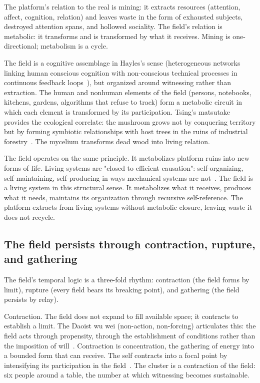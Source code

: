 The platform's relation to the real is mining: it extracts resources (attention, affect, cognition, relation) and leaves waste in the form of exhausted subjects, destroyed attention spans, and hollowed sociality. The field's relation is metabolic: it transforms and is transformed by what it receives. Mining is one-directional; metabolism is a cycle.

The field is a cognitive assemblage in Hayles's sense (heterogeneous networks linking human conscious cognition with non-conscious technical processes in continuous feedback loops~\cite{hayles2017}), but organized around witnessing rather than extraction. The human and nonhuman elements of the field (persons, notebooks, kitchens, gardens, algorithms that refuse to track) form a metabolic circuit in which each element is transformed by its participation. Tsing's matsutake provides the ecological correlate: the mushroom grows not by conquering territory but by forming symbiotic relationships with host trees in the ruins of industrial forestry~\cite{tsing2015}. The mycelium transforms dead wood into living relation.

The field operates on the same principle. It metabolizes platform ruins into new forms of life. Living systems are "closed to efficient causation": self-organizing, self-maintaining, self-producing in ways mechanical systems are not~\cite{rosen1991}. The field is a living system in this structural sense. It metabolizes what it receives, produces what it needs, maintains its organization through recursive self-reference. The platform extracts from living systems without metabolic closure, leaving waste it does not recycle.

\subsection{The field persists through contraction, rupture, and gathering}

The field's temporal logic is a three-fold rhythm: contraction (the field forms by limit), rupture (every field bears its breaking point), and gathering (the field persists by relay).

Contraction. The field does not expand to fill available space; it contracts to establish a limit. The Daoist wu wei (non-action, non-forcing) articulates this: the field acts through propensity, through the establishment of conditions rather than the imposition of will~\cite[ch.~48]{laozi_daodejing}\cite{jullien1992}. Contraction is concentration, the gathering of energy into a bounded form that can receive. The self contracts into a focal point by intensifying its participation in the field~\cite{ames2011}. The cluster is a contraction of the field: six people around a table, the number at which witnessing becomes sustainable.

